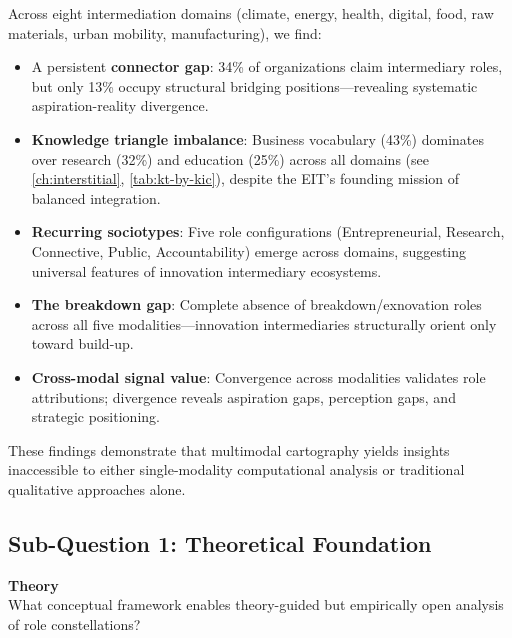 \documentclass[../main.tex]{subfiles}
\begin{document}
Across eight intermediation domains (climate, energy, health, digital, food, raw materials, urban mobility, manufacturing), we find:

\begin{itemize}[leftmargin=*, itemsep=0.3em]
\item A persistent \textbf{connector gap}: 34\% of organizations claim intermediary roles, but only 13\% occupy structural bridging positions---revealing systematic aspiration-reality divergence.
\item \textbf{Knowledge triangle imbalance}: Business vocabulary (43\%) dominates over research (32\%) and education (25\%) across all domains (see \cref{ch:interstitial}, \cref{tab:kt-by-kic}), despite the EIT's founding mission of balanced integration.
\item \textbf{Recurring sociotypes}: Five role configurations (Entrepreneurial, Research, Connective, Public, Accountability) emerge across domains, suggesting universal features of innovation intermediary ecosystems.
\item \textbf{The breakdown gap}: Complete absence of breakdown/exnovation roles across all five modalities---innovation intermediaries structurally orient only toward build-up.
\item \textbf{Cross-modal signal value}: Convergence across modalities validates role attributions; divergence reveals aspiration gaps, perception gaps, and strategic positioning.
\end{itemize}

These findings demonstrate that multimodal cartography yields insights inaccessible to either single-modality computational analysis or traditional qualitative approaches alone.

\subsection{Sub-Question 1: Theoretical Foundation}

\begin{subrq}
\textbf{Theory}\\
What conceptual framework enables theory-guided but empirically open analysis of role constellations?
\end{subrq}
\end{document}
